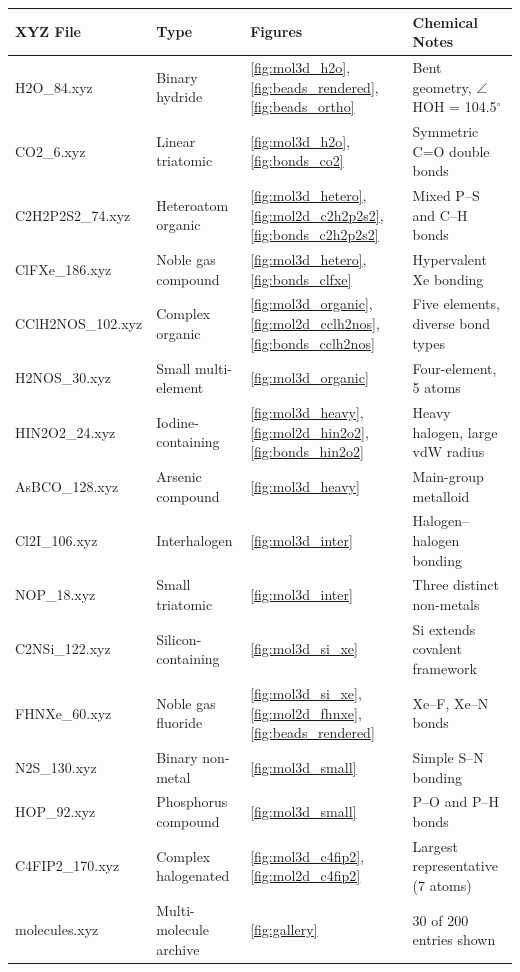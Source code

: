 \documentclass[11pt,a4paper]{article}
\begin{document}
\begin{center}
\small
\begin{tabular}{lllp{6cm}}
\toprule
\textbf{XYZ File} & \textbf{Type} & \textbf{Figures} & \textbf{Chemical Notes} \\
\midrule
H2O\_84.xyz & Binary hydride &
  \ref{fig:mol3d_h2o}, \ref{fig:beads_rendered}, \ref{fig:beads_ortho} &
  Bent geometry, $\angle$HOH = 104.5$^\circ$ \\
CO2\_6.xyz & Linear triatomic &
  \ref{fig:mol3d_h2o}, \ref{fig:bonds_co2} &
  Symmetric C=O double bonds \\
C2H2P2S2\_74.xyz & Heteroatom organic &
  \ref{fig:mol3d_hetero}, \ref{fig:mol2d_c2h2p2s2}, \ref{fig:bonds_c2h2p2s2} &
  Mixed P--S and C--H bonds \\
ClFXe\_186.xyz & Noble gas compound &
  \ref{fig:mol3d_hetero}, \ref{fig:bonds_clfxe} &
  Hypervalent Xe bonding \\
CClH2NOS\_102.xyz & Complex organic &
  \ref{fig:mol3d_organic}, \ref{fig:mol2d_cclh2nos}, \ref{fig:bonds_cclh2nos} &
  Five elements, diverse bond types \\
H2NOS\_30.xyz & Small multi-element &
  \ref{fig:mol3d_organic} &
  Four-element, 5 atoms \\
HIN2O2\_24.xyz & Iodine-containing &
  \ref{fig:mol3d_heavy}, \ref{fig:mol2d_hin2o2}, \ref{fig:bonds_hin2o2} &
  Heavy halogen, large vdW radius \\
AsBCO\_128.xyz & Arsenic compound &
  \ref{fig:mol3d_heavy} &
  Main-group metalloid \\
Cl2I\_106.xyz & Interhalogen &
  \ref{fig:mol3d_inter} &
  Halogen--halogen bonding \\
NOP\_18.xyz & Small triatomic &
  \ref{fig:mol3d_inter} &
  Three distinct non-metals \\
C2NSi\_122.xyz & Silicon-containing &
  \ref{fig:mol3d_si_xe} &
  Si extends covalent framework \\
FHNXe\_60.xyz & Noble gas fluoride &
  \ref{fig:mol3d_si_xe}, \ref{fig:mol2d_fhnxe}, \ref{fig:beads_rendered} &
  Xe--F, Xe--N bonds \\
N2S\_130.xyz & Binary non-metal &
  \ref{fig:mol3d_small} &
  Simple S--N bonding \\
HOP\_92.xyz & Phosphorus compound &
  \ref{fig:mol3d_small} &
  P--O and P--H bonds \\
C4FIP2\_170.xyz & Complex halogenated &
  \ref{fig:mol3d_c4fip2}, \ref{fig:mol2d_c4fip2} &
  Largest representative (7 atoms) \\
molecules.xyz & Multi-molecule archive &
  \ref{fig:gallery} &
  30 of 200 entries shown \\
\bottomrule
\end{tabular}
\end{center}
\end{document}

